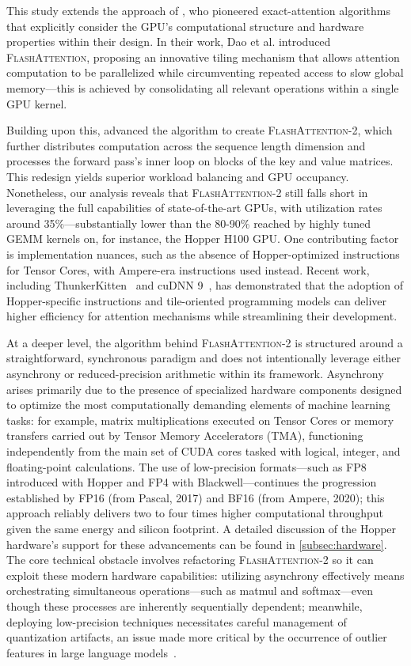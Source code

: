 This study extends the approach of \citet{dao2022flashattention}, who pioneered exact-attention algorithms that explicitly consider the GPU’s computational structure and hardware properties within their design. In their work, Dao et al. introduced \textsc{FlashAttention}, proposing an innovative tiling mechanism that allows attention computation to be parallelized while circumventing repeated access to slow global memory—this is achieved by consolidating all relevant operations within a single GPU kernel.

Building upon this, \citet{dao2023flashattention2} advanced the algorithm to create \textsc{FlashAttention-2}, which further distributes computation across the sequence length dimension and processes the forward pass’s inner loop on blocks of the key and value matrices. This redesign yields superior workload balancing and GPU occupancy. Nonetheless, our analysis reveals that \textsc{FlashAttention-2} still falls short in leveraging the full capabilities of state-of-the-art GPUs, with utilization rates around 35\%—substantially lower than the 80-90\% reached by highly tuned GEMM kernels on, for instance, the Hopper H100 GPU. One contributing factor is implementation nuances, such as the absence of Hopper-optimized instructions for Tensor Cores, with Ampere-era instructions used instead. Recent work, including ThunkerKitten~\citep{spector2024thunder} and cuDNN 9~\citep{cudnn9}, has demonstrated that the adoption of Hopper-specific instructions and tile-oriented programming models can deliver higher efficiency for attention mechanisms while streamlining their development.

At a deeper level, the algorithm behind \textsc{FlashAttention-2} is structured around a straightforward, synchronous paradigm and does not intentionally leverage either asynchrony or reduced-precision arithmetic within its framework. Asynchrony arises primarily due to the presence of specialized hardware components designed to optimize the most computationally demanding elements of machine learning tasks: for example, matrix multiplications executed on Tensor Cores or memory transfers carried out by Tensor Memory Accelerators (TMA), functioning independently from the main set of CUDA cores tasked with logical, integer, and floating-point calculations. The use of low-precision formats—such as FP8 introduced with Hopper and FP4 with Blackwell—continues the progression established by FP16 (from Pascal, 2017) and BF16 (from Ampere, 2020); this approach reliably delivers two to four times higher computational throughput given the same energy and silicon footprint. A detailed discussion of the Hopper hardware's support for these advancements can be found in \cref{subsec:hardware}. The core technical obstacle involves refactoring \textsc{FlashAttention-2} so it can exploit these modern hardware capabilities: utilizing asynchrony effectively means orchestrating simultaneous operations—such as matmul and softmax—even though these processes are inherently sequentially dependent; meanwhile, deploying low-precision techniques necessitates careful management of quantization artifacts, an issue made more critical by the occurrence of outlier features in large language models~\citep{dettmers2208llm, sun2024massive}.

